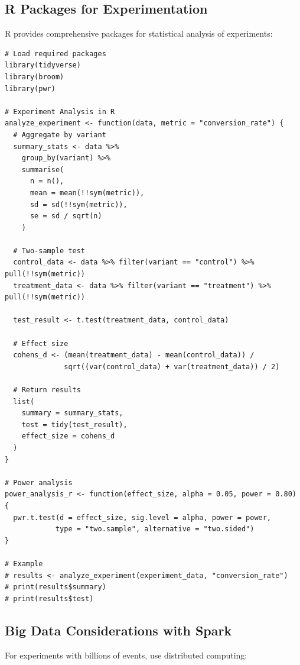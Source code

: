 \subsection{R Packages for Experimentation}

R provides comprehensive packages for statistical analysis of experiments:

\lstset{language=R, caption=R Analysis of Experiments}
\begin{lstlisting}
# Load required packages
library(tidyverse)
library(broom)
library(pwr)

# Experiment Analysis in R
analyze_experiment <- function(data, metric = "conversion_rate") {
  # Aggregate by variant
  summary_stats <- data %>%
    group_by(variant) %>%
    summarise(
      n = n(),
      mean = mean(!!sym(metric)),
      sd = sd(!!sym(metric)),
      se = sd / sqrt(n)
    )

  # Two-sample test
  control_data <- data %>% filter(variant == "control") %>% pull(!!sym(metric))
  treatment_data <- data %>% filter(variant == "treatment") %>% pull(!!sym(metric))

  test_result <- t.test(treatment_data, control_data)

  # Effect size
  cohens_d <- (mean(treatment_data) - mean(control_data)) /
              sqrt((var(control_data) + var(treatment_data)) / 2)

  # Return results
  list(
    summary = summary_stats,
    test = tidy(test_result),
    effect_size = cohens_d
  )
}

# Power analysis
power_analysis_r <- function(effect_size, alpha = 0.05, power = 0.80) {
  pwr.t.test(d = effect_size, sig.level = alpha, power = power,
            type = "two.sample", alternative = "two.sided")
}

# Example
# results <- analyze_experiment(experiment_data, "conversion_rate")
# print(results$summary)
# print(results$test)
\end{lstlisting}

\subsection{Big Data Considerations with Spark}

For experiments with billions of events, use distributed computing:


